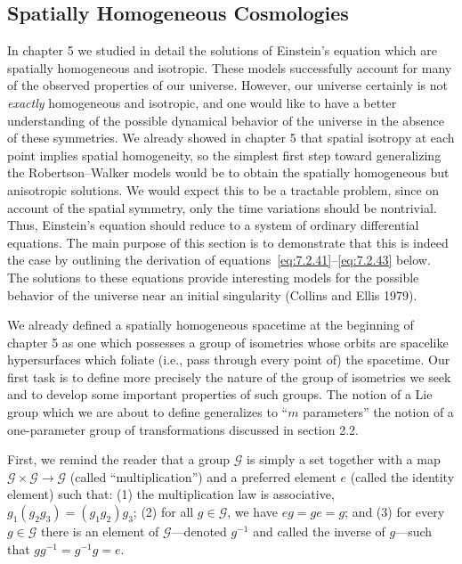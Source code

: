 
\subsection{Spatially Homogeneous Cosmologies}\label{sec:7.2}

In chapter 5 we studied in detail the solutions of Einstein's equation which are
spatially homogeneous and isotropic. These models successfully account for many
of the observed properties of our universe. However, our universe certainly is not
\emph{exactly} homogeneous and isotropic, and one would like to have a better
understanding of the possible dynamical behavior of the universe in the absence of
these symmetries. We already showed in chapter 5 that spatial isotropy at each point
implies spatial homogeneity, so the simplest first step toward generalizing the
Robertson--Walker models would be to obtain the spatially homogeneous but
anisotropic solutions. We would expect this to be a tractable problem, since on
account of the spatial symmetry, only the time variations should be nontrivial. Thus,
Einstein's equation should reduce to a system of ordinary differential equations. The
main purpose of this section is to demonstrate that this is indeed the case by outlining
the derivation of equations~\eqref{eq:7.2.41}--\eqref{eq:7.2.43} below. The solutions
to these equations provide interesting models for the possible behavior of the
universe near an initial singularity (Collins and Ellis 1979).

We already defined a spatially homogeneous spacetime at the beginning of chapter 5
as one which possesses a group of isometries whose orbits are spacelike
hypersurfaces which foliate (i.e., pass through every point of) the spacetime. Our first
task is to define more precisely the nature of the group of isometries we seek and to
develop some important properties of such groups. The notion of a Lie group which
we are about to define generalizes to “\(m\) parameters” the notion of a
one-parameter group of transformations discussed in section 2.2.

First, we remind the reader that a group \(\mathcal G\) is simply a set together with
a map \(\mathcal G\times\mathcal G\longrightarrow\mathcal G\) (called
“multiplication”) and a preferred element \(e\) (called the identity element) such
that: (1) the multiplication law is associative,
\(g_1(g_2g_3)=(g_1g_2)g_3\); (2) for all \(g\in\mathcal G\), we have
\(eg=ge=g\); and (3) for every \(g\in\mathcal G\) there is an element of
\(\mathcal G\)---denoted \(g^{-1}\) and called the inverse of \(g\)---such that
\(gg^{-1}=g^{-1}g=e\).

